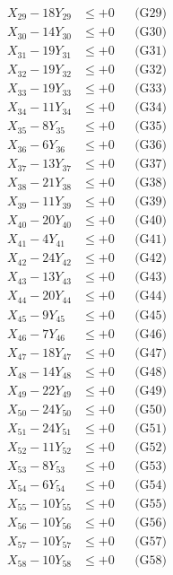 \documentclass[a4paper,10pt]{article}
\begin{document}
{\begin{align}
X_{29} - 18Y_{29} &\leq +0 && \text{(G29)} \\
X_{30} - 14Y_{30} &\leq +0 && \text{(G30)} \\
X_{31} - 19Y_{31} &\leq +0 && \text{(G31)} \\
X_{32} - 19Y_{32} &\leq +0 && \text{(G32)} \\
X_{33} - 19Y_{33} &\leq +0 && \text{(G33)} \\
X_{34} - 11Y_{34} &\leq +0 && \text{(G34)} \\
X_{35} - 8Y_{35} &\leq +0 && \text{(G35)} \\
X_{36} - 6Y_{36} &\leq +0 && \text{(G36)} \\
X_{37} - 13Y_{37} &\leq +0 && \text{(G37)} \\
\allowbreak
X_{38} - 21Y_{38} &\leq +0 && \text{(G38)} \\
X_{39} - 11Y_{39} &\leq +0 && \text{(G39)} \\
X_{40} - 20Y_{40} &\leq +0 && \text{(G40)} \\
X_{41} - 4Y_{41} &\leq +0 && \text{(G41)} \\
X_{42} - 24Y_{42} &\leq +0 && \text{(G42)} \\
X_{43} - 13Y_{43} &\leq +0 && \text{(G43)} \\
X_{44} - 20Y_{44} &\leq +0 && \text{(G44)} \\
X_{45} - 9Y_{45} &\leq +0 && \text{(G45)} \\
X_{46} - 7Y_{46} &\leq +0 && \text{(G46)} \\
X_{47} - 18Y_{47} &\leq +0 && \text{(G47)} \\
\allowbreak
X_{48} - 14Y_{48} &\leq +0 && \text{(G48)} \\
X_{49} - 22Y_{49} &\leq +0 && \text{(G49)} \\
X_{50} - 24Y_{50} &\leq +0 && \text{(G50)} \\
X_{51} - 24Y_{51} &\leq +0 && \text{(G51)} \\
X_{52} - 11Y_{52} &\leq +0 && \text{(G52)} \\
X_{53} - 8Y_{53} &\leq +0 && \text{(G53)} \\
X_{54} - 6Y_{54} &\leq +0 && \text{(G54)} \\
X_{55} - 10Y_{55} &\leq +0 && \text{(G55)} \\
X_{56} - 10Y_{56} &\leq +0 && \text{(G56)} \\
X_{57} - 10Y_{57} &\leq +0 && \text{(G57)} \\
\allowbreak
X_{58} - 10Y_{58} &\leq +0 && \text{(G58)} \\

\end{align}}
\end{document}
